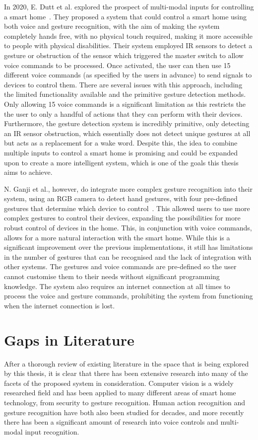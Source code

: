 In 2020, E. Dutt et al. explored the prospect of multi-modal inputs for controlling a smart home~\cite{Dutt20}.
They proposed a system that could control a smart home using both voice and gesture recognition, with the aim of making the system completely hands free, with no physical touch required, making it more accessible to people with physical disabilities.
Their system employed IR sensors to detect a gesture or obstruction of the sensor which triggered the master switch to allow voice commands to be processed.
Once activated, the user can then use 15 different voice commands (as specified by the users in advance) to send signals to devices to control them.
There are several issues with this approach, including the limited functionality available and the primitive gesture detection methods.
Only allowing 15 voice commands is a significant limitation as this restricts the the user to only a handful of actions that they can perform with their devices.
Furthermore, the gesture detection system is incredibly primitive, only detecting an IR sensor obstruction, which essentially does not detect unique gestures at all but acts as a replacement for a wake word.
Despite this, the idea to combine multiple inputs to control a smart home is promising and could be expanded upon to create a more intelligent system, which is one of the goals this thesis aims to achieve.

N. Ganji et al., however, do integrate more complex gesture recognition into their system, using an RGB camera to detect hand gestures, with four pre-defined gestures that determine which device to control~\cite{Ganj22}.
This allowed users to use more complex gestures to control their devices, expanding the possibilities for more robust control of devices in the home.
This, in conjunction with voice commands, allows for a more natural interaction with the smart home.
While this is a significant improvement over the previous implementations, it still has limitations in the number of gestures that can be recognised and the lack of integration with other systems.
The gestures and voice commands are pre-defined so the user cannot customise them to their needs without significant programming knowledge.
The system also requires an internet connection at all times to process the voice and gesture commands, prohibiting the system from functioning when the internet connection is lost.

\section{Gaps in Literature}
After a thorough review of existing literature in the space that is being explored by this thesis, it is clear that there has been extensive research into many of the facets of the proposed system in consideration.
Computer vision is a widely researched field and has been applied to many different areas of smart home technology, from security to gesture recognition.
Human action recognition and gesture recognition have both also been studied for decades, and more recently there has been a significant amount of research into voice controls and multi-modal input recognition.

